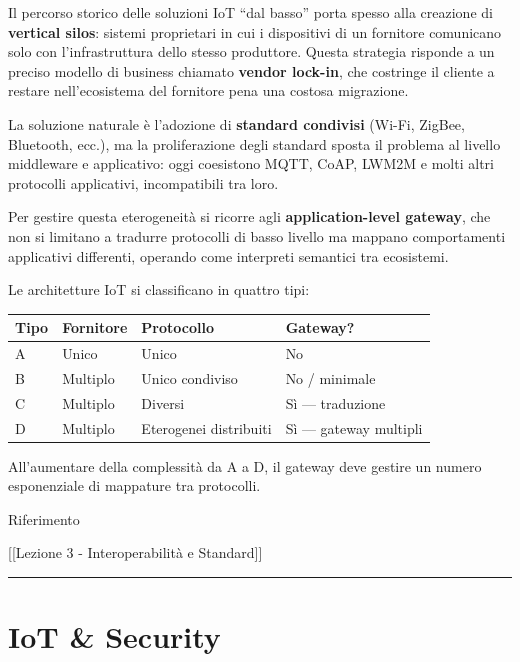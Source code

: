 \documentclass[
  italian,
  openany]{book}
\newcounter{none} %
\begin{document}
Il percorso storico delle soluzioni IoT ``dal basso'' porta spesso alla
creazione di \textbf{vertical silos}: sistemi proprietari in cui i
dispositivi di un fornitore comunicano solo con l'infrastruttura dello
stesso produttore. Questa strategia risponde a un preciso modello di
business chiamato \textbf{vendor lock-in}, che costringe il cliente a
restare nell'ecosistema del fornitore pena una costosa migrazione.

La soluzione naturale è l'adozione di \textbf{standard condivisi}
(Wi-Fi, ZigBee, Bluetooth, ecc.), ma la proliferazione degli standard
sposta il problema al livello middleware e applicativo: oggi coesistono
MQTT, CoAP, LWM2M e molti altri protocolli applicativi, incompatibili
tra loro.

Per gestire questa eterogeneità si ricorre agli
\textbf{application-level gateway}, che non si limitano a tradurre
protocolli di basso livello ma mappano comportamenti applicativi
differenti, operando come interpreti semantici tra ecosistemi.

Le architetture IoT si classificano in quattro tipi:

{\def\LTcaptype{none} %
\begin{longtable}[]{@{}llll@{}}
\toprule\noalign{}
Tipo & Fornitore & Protocollo & Gateway? \\
\midrule\noalign{}
\endhead
\bottomrule\noalign{}
\endlastfoot
A & Unico & Unico & No \\
B & Multiplo & Unico condiviso & No / minimale \\
C & Multiplo & Diversi & Sì --- traduzione \\
D & Multiplo & Eterogenei distribuiti & Sì --- gateway multipli \\
\end{longtable}
}

All'aumentare della complessità da A a D, il gateway deve gestire un
numero esponenziale di mappature tra protocolli.

\begin{calloutnote}{Riferimento}

{[}{[}Lezione 3 - Interoperabilità e Standard{]}{]}

\end{calloutnote}

\begin{center}\rule{0.5\linewidth}{0.5pt}\end{center}

\section{IoT \& Security}\label{iot-security}
\end{document}
